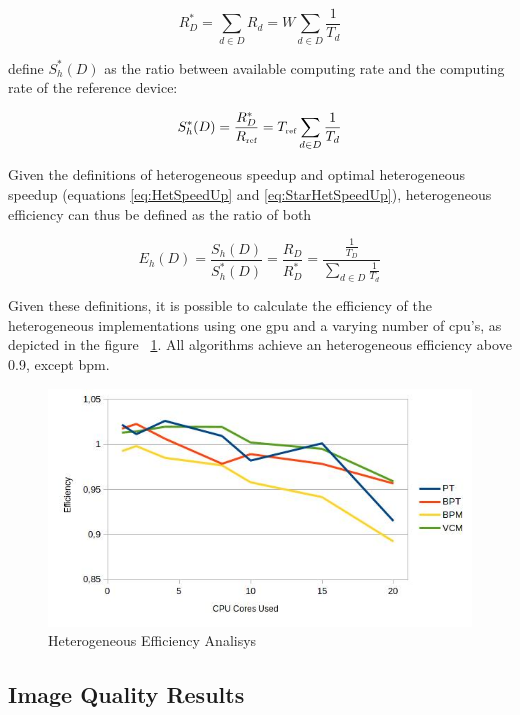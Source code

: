 \begin{equation}
R^*_D = \sum_{d \in D} R_d = W \sum_{d \in D} \frac{1}{T_d}
\label{eq:StarCapacity}
\end{equation}

\cite{Chamberlain98} define $S_h^*(D)$ as the ratio between available computing rate and the computing rate of the reference device:

\begin{equation}
S^*_h(D) = \frac{R^*_D}{R_{\mbox{\tiny ref}}} = T_{\mbox{\tiny ref}} \sum_{d \in D} \frac{1}{T_d}
\label{eq:StarHetSpeedUp}
\end{equation}

Given the definitions of heterogeneous speedup and optimal heterogeneous speedup (equations \ref{eq:HetSpeedUp} and \ref{eq:StarHetSpeedUp}), heterogeneous efficiency can thus be defined as the ratio of both

\begin{equation}
E_h(D) = \frac{S_h(D)}{S_h^*(D)} = \frac{R_D}{R^*_D} = \frac{\frac{1}{T_D}}{\sum_{d \in D} \frac{1}{T_d}}
\label{eq:HetEff}
\end{equation}

Given these definitions, it is possible to calculate the efficiency of the heterogeneous implementations using one \gls{gpu} and a varying number of \gls{cpu}'s, as depicted in the figure ~\ref{img:hefficiency}. All algorithms achieve an heterogeneous efficiency above 0.9, except \gls{bpm}.

\begin{figure}[H]
\centering
\includegraphics[width=0.8\linewidth]{img/hefficiency.jpg}
\caption{\label{img:hefficiency} Heterogeneous Efficiency Analisys}
\end{figure}


\subsection{Image Quality Results}

